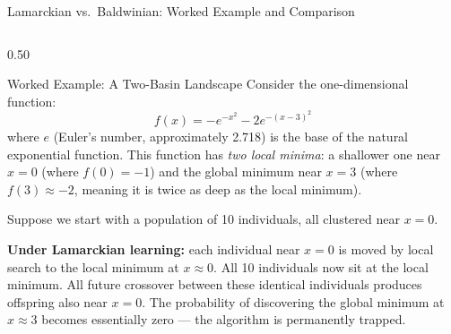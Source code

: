 \documentclass[aspectratio=169,10pt]{beamer}
\begin{document}
\begin{frame}[allowframebreaks]{Lamarckian vs.\ Baldwinian: Worked Example and Comparison}

  \begin{columns}[T]
    \begin{column}{0.50\textwidth}
      \begin{exampleblock}{Worked Example: A Two-Basin Landscape}
        Consider the one-dimensional function:
        \[
          f(x) = -e^{-x^2} - 2e^{-(x-3)^2}
        \]
        where $e$ (Euler's number, approximately 2.718) is the base
        of the natural exponential function.  This function has
        \emph{two local minima}: a shallower one near $x = 0$
        (where $f(0) = -1$) and the global minimum near $x = 3$
        (where $f(3) \approx -2$, meaning it is twice as deep as
        the local minimum).

        Suppose we start with a population of 10 individuals, all
        clustered near $x = 0$.

        \textbf{Under Lamarckian learning:} each individual near
        $x = 0$ is moved by local search to the local minimum at
        $x \approx 0$.  All 10 individuals now sit at the local
        minimum.  All future crossover between these identical
        individuals produces offspring also near $x = 0$.  The
        probability of discovering the global minimum at $x \approx
        3$ becomes essentially zero --- the algorithm is permanently
        trapped.


\end{exampleblock}
\end{column}
\end{columns}
\end{frame}
\end{document}

